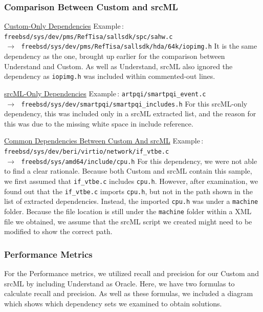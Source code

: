 \documentclass[12pt, dvipsnames, a4paper]{article}
\begin{document}
\subsubsection{Comparison Between Custom and srcML}
\underline{Custom-Only Dependencies}
\newline
\newline
Example$\,\colon\,$\texttt{freebsd/sys/dev/pms/RefTisa/sallsdk/spc/sahw.c \\$\,\to\,$ freebsd/sys/dev/pms/RefTisa/sallsdk/hda/64k/iopimg.h}
\newline
\newline
It is the same dependency as the one, brought up earlier for the comparison between Understand and Custom. As well as Understand, srcML also ignored the dependency as \texttt{iopimg.h} was included within commented-out lines.

\underline{srcML-Only Dependencies}
\newline
\newline
Example$\,\colon\,$\texttt{artpqi/smartpqi\_event.c \\$\,\to\,$ freebsd/sys/dev/smartpqi/smartpqi\_includes.h}
\newline
\newline
For this srcML-only dependency, this was included only in a srcML extracted list, and the reason for this was due to the missing white space in include reference.

\underline{Common Dependencies Between Custom And srcML}
\newline
\newline
Example$\,\colon\,$\texttt{freebsd/sys/dev/beri/virtio/network/if\_vtbe.c \\$\,\to\,$ freebsd/sys/amd64/include/cpu.h}
\newline
\newline
For this dependency, we were not able to find a clear rationale. Because both Custom and srcML contain this sample, we first assumed that \texttt{if\_vtbe.c} includes \texttt{cpu.h}. However, after examination, we found out that the \texttt{if\_vtbe.c} imports \texttt{cpu.h}, but not in the path shown in the list of extracted dependencies. Instead, the imported \texttt{cpu.h} was under a \texttt{machine} folder.
Because the file location is still under the \texttt{machine} folder within a XML file we obtained, we assume that the srcML script we created might need to be modified to show the correct path.
\clearpage

\subsubsection{Performance Metrics}
For the Performance metrics, we utilized recall and precision for our Custom and srcML by including Understand as Oracle.
Here, we have two formulas to calculate recall and precision. As well as these formulas, we included a diagram which shows which dependency sets we examined to obtain solutions.
\end{document}
